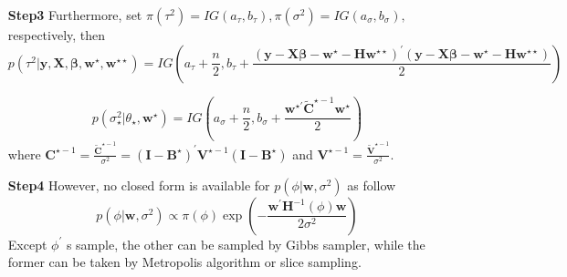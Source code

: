 \documentclass[
12pt, %
a4paper, %
oneside, %
headinclude,footinclude, %
BCOR5mm, %
]{scrartcl}
\begin{document}
\begin{itemize}
\begin{itemize}
\item [\textbf{Step3}] Furthermore, set
\(\pi\left(\tau^{2}\right)=I G\left(a_{\tau}, b_{\tau}\right), \pi\left(\sigma^{2}\right)=I G\left(a_{\sigma}, b_{\sigma}\right),\)
respectively, then \begin{equation}
p\left(\tau^{2} | \boldsymbol{y}, \boldsymbol{X}, \boldsymbol{\beta}, \boldsymbol{w}^{\star}, \boldsymbol{w}^{\star\star}\right)=I G\left(a_{\tau}+\frac{n}{2}, b_{\tau}+\frac{(\boldsymbol{y}-\boldsymbol{X} \boldsymbol{\beta}-\boldsymbol{w}^{\star} -  \boldsymbol{H}\boldsymbol{w}^{\star\star})^{\prime}(\boldsymbol{y}-\boldsymbol{X} \boldsymbol{\beta}-\boldsymbol{w}^{\star}-  \boldsymbol{H}\boldsymbol{w}^{\star\star})}{2}\right)
\end{equation}

\begin{equation}
p\left(\sigma^{2}_{\star} | \theta_{\star}, \boldsymbol{w}^{\star}\right)=I G\left(a_{\sigma}+\frac{n}{2}, b_{\sigma}+\frac{\boldsymbol{w}^{\star \prime} \boldsymbol{\tilde{C}}^{\star -1} \boldsymbol{w}^{\star}}{2}\right)
\end{equation}
where $\boldsymbol{C}^{\star -1} = \frac{ \boldsymbol{\tilde{C}}^{\star -1}}{\sigma^2}  = \left(\boldsymbol{I} - \boldsymbol{B}^{\star}\right)^\prime\boldsymbol{V}^{\star - 1}\left(\boldsymbol{I} - \boldsymbol{B}^{\star}\right)$ and $\boldsymbol{V}^{\star - 1} = \frac{\boldsymbol{\tilde{V}}^{\star - 1}}{\sigma^2}.$



 \item [\textbf{Step4}] However, no closed form is available for
\(p\left(\phi | \boldsymbol{w}, \sigma^{2}\right)\) as follow
\begin{equation}
p\left(\phi | \boldsymbol{w}, \sigma^{2}\right) \propto \pi(\phi) \exp \left(-\frac{\boldsymbol{w}^{\prime} \boldsymbol{H}^{-1}(\phi) \boldsymbol{w}}{2\sigma^2}\right)
\end{equation} Except \(\phi^{\prime}\) s sample, the other can be
sampled by Gibbs sampler, while the former can be taken by Metropolis
algorithm or slice sampling.
\end{itemize}




\end{itemize}
\end{document}
